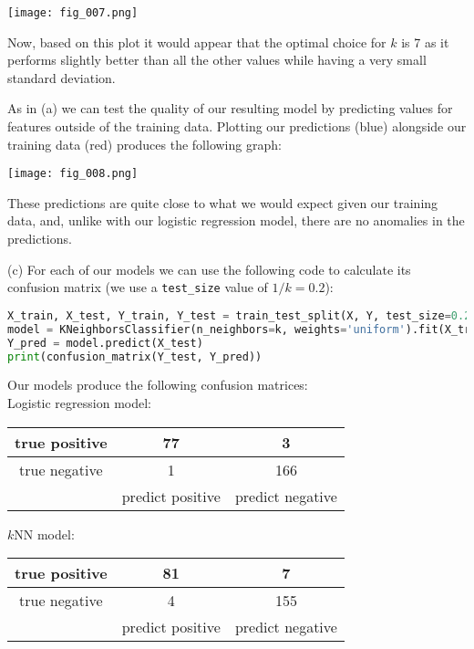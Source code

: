 \documentclass[12pt]{article}
\begin{document}
\begin{center}
    \texttt{[image: fig\_007.png]}
\end{center}

Now, based on this plot it would appear that the optimal choice for $k$ is 7 as it performs slightly better than all the other values while having a very small standard deviation.

As in (a) we can test the quality of our resulting model by predicting values for features outside of the training data. Plotting our predictions (blue) alongside our training data (red) produces the following graph:

\begin{center}
    \texttt{[image: fig\_008.png]}
\end{center}

These predictions are quite close to what we would expect given our training data, and, unlike with our logistic regression model, there are no anomalies in the predictions.

\noindent (c) For each of our models we can use the following code to calculate its confusion matrix (we use a \texttt{test\_size} value of $1 / k = 0.2$):

\lstset{basicstyle=\footnotesize}
\begin{lstlisting}[language=Python]
X_train, X_test, Y_train, Y_test = train_test_split(X, Y, test_size=0.2)
model = KNeighborsClassifier(n_neighbors=k, weights='uniform').fit(X_train, Y_train)
Y_pred = model.predict(X_test)
print(confusion_matrix(Y_test, Y_pred))
\end{lstlisting}

\noindent Our models produce the following confusion matrices: \\

Logistic regression model:

\begin{center}
    \begin{tabular}{c|c|c|}
        \hline
        true positive & 77 & 3 \\ \hline
        true negative & 1 & 166 \\ \hline
        & predict positive & predict negative \\
    \end{tabular}
\end{center}

$k$NN model:

\begin{center}
    \begin{tabular}{c|c|c|}
        \hline
        true positive & 81 & 7 \\ \hline
        true negative & 4 & 155 \\ \hline
        & predict positive & predict negative \\
    \end{tabular}
\end{center}
\end{document}
